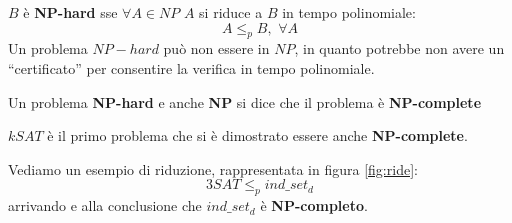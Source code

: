 \documentclass[a4paper,12pt, oneside]{book}
\begin{document}
\begin{definizione}
  $B$ è \textbf{NP-hard} sse $\forall A\in NP$ $A$ si riduce a $B$ in tempo
  polinomiale:
  \[A\leq_p B,\,\,\forall A\]
  Un problema $NP-hard$ può non essere in $NP$, in quanto potrebbe non avere un
  ``certificato'' per consentire la verifica in tempo polinomiale.
\end{definizione}
\begin{definizione}
  Un problema \textbf{NP-hard} e anche \textbf{NP} si dice che il problema è
  \textbf{NP-complete} 
\end{definizione}
$kSAT$ è il primo problema che si è dimostrato essere anche
\textbf{NP-complete}.
\begin{esempio}
  Vediamo un esempio di riduzione, rappresentata in figura \ref{fig:ride}:
  \[3SAT\leq_p ind\_set_d\]
  arrivando e alla conclusione che $ind\_set_d$ è \textbf{NP-completo}.\\
  \begin{figure}
    \centering
    

\end{figure}
\end{esempio}
\end{document}
